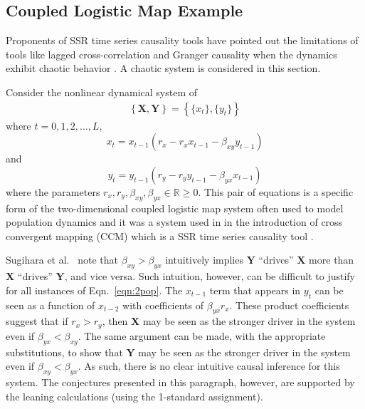 \documentclass[twocolumn,aps,pre,groupedaddress]{revtex4-1}
\begin{document}
\subsection{Coupled Logistic Map Example}
\label{sec:2Pop}

Proponents of SSR time series causality tools have pointed out the limitations of tools like lagged cross-correlation and Granger causality when the dynamics exhibit chaotic behavior \cite{Sugihara2012}.  A chaotic system is considered in this section.

Consider the nonlinear dynamical system of
\begin{eqnarray}
\label{eqn:2pop}
\left\{\mathbf{X},\mathbf{Y}\right\} = \left\{\{x_t\},\{y_t\}\right\}
\end{eqnarray}
where $t=0,1,2,\ldots,L$,
\begin{equation*}
x_t = x_{t-1}\left(r_x-r_x x_{t-1}-\beta_{xy} y_{t-1}\right)
\end{equation*}
and
\begin{equation*}
y_t = y_{t-1}\left(r_y-r_y y_{t-1}-\beta_{yx} x_{t-1}\right)
\end{equation*}
where the parameters $r_x,r_y,\beta_{xy},\beta_{yx}\in\mathbb{R}\ge 0$.  This pair of equations is a specific form of the two-dimensional coupled logistic map system often used to model population dynamics \cite{Lloyd1995} and it was a system used in in the introduction of cross convergent mapping (CCM) which is a SSR time series causality tool \cite{Sugihara2012}.

Sugihara et al.\ \cite{Sugihara2012} note that $\beta_{xy}>\beta_{yx}$ intuitively implies $\mathbf{Y}$ ``drives'' $\mathbf{X}$ more than $\mathbf{X}$ ``drives'' $\mathbf{Y}$, and vice versa.  Such intuition, however, can be difficult to justify for all instances of Eqn.\ \ref{eqn:2pop}.  The $x_{t-1}$ term that appears in $y_t$ can be seen as a function of $x_{t-2}$ with coefficients of $\beta_{yx}r_x$.  These product coefficients suggest that if $r_x>r_y$, then $\mathbf{X}$ may be seen as the stronger driver in the system even if $\beta_{yx}<\beta_{xy}$.  The same argument can be made, with the appropriate substitutions, to show that $\mathbf{Y}$ may be seen as the stronger driver in the system even if $\beta_{xy}<\beta_{yx}$.  As such, there is no clear intuitive causal inference for this system.  The conjectures presented in this paragraph, however, are supported by the leaning calculations (using the 1-standard assignment).
\end{document}
